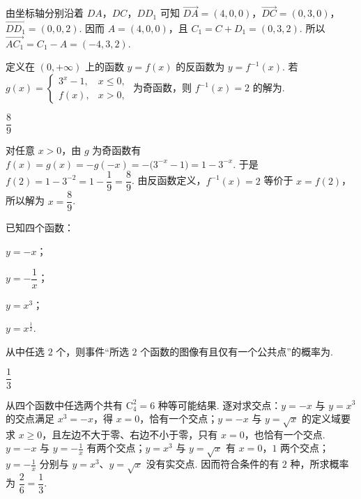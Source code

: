 \begin{solution}
由坐标轴分别沿着 \(DA\)，\(DC\)，\(DD_1\) 可知 \(\overrightarrow{DA}=(4,0,0)\)，\(\overrightarrow{DC}=(0,3,0)\)，\(\overrightarrow{DD_1}=(0,0,2)\). 因而 \(A=(4,0,0)\)，且 \(C_1=C+D_1=(0,3,2)\). 所以 \(\overrightarrow{AC_1}=C_1-A=(-4,3,2)\).
\end{solution}

\begin{problem}
定义在 \((0,+\infty)\) 上的函数 \(y=f(x)\) 的反函数为 \(y=f^{-1}(x)\). 若
\(g(x)=\begin{cases}
3^x-1,&x\le 0,\\
f(x),&x>0,
\end{cases}\)
为奇函数，则 \(f^{-1}(x)=2\) 的解为\fillinblank{}.
\end{problem}

\begin{answer}
\(\dfrac89\)
\end{answer}

\begin{solution}
对任意 \(x>0\)，由 \(g\) 为奇函数有 \(f(x)=g(x)=-g(-x)=-\bigl(3^{-x}-1\bigr)=1-3^{-x}\). 于是 \(f(2)=1-3^{-2}=1-\dfrac19=\dfrac89\). 由反函数定义，\(f^{-1}(x)=2\) 等价于 \(x=f(2)\)，所以解为 \(x=\dfrac89\).
\end{solution}

\begin{problem}
已知四个函数：
\begin{circlelist}
\item \(y=-x\)；
\item \(y=-\dfrac1x\)；
\item \(y=x^3\)；
\item \(y=x^{\frac12}\).
\end{circlelist}
从中任选 \(2\) 个，则事件“所选 \(2\) 个函数的图像有且仅有一个公共点”的概率为\fillinblank{}.
\end{problem}

\begin{answer}
\(\dfrac13\)
\end{answer}

\begin{solution}
从四个函数中任选两个共有 \(\mathrm C_4^2=6\) 种等可能结果. 逐对求交点：\(y=-x\) 与 \(y=x^3\) 的交点满足 \(x^3=-x\)，得 \(x=0\)，恰有一个交点；\(y=-x\) 与 \(y=\sqrt{x}\) 的定义域要求 \(x\ge0\)，且左边不大于零、右边不小于零，只有 \(x=0\)，也恰有一个交点. \(y=-x\) 与 \(y=-\frac{1}{x}\) 有两个交点；\(y=x^3\) 与 \(y=\sqrt{x}\) 有 \(x=0\)，\(1\) 两个交点；\(y=-\frac{1}{x}\) 分别与 \(y=x^3\)、\(y=\sqrt{x}\) 没有实交点. 因而符合条件的有 \(2\) 种，所求概率为 \(\dfrac{2}{6}=\dfrac13\).
\end{solution}

